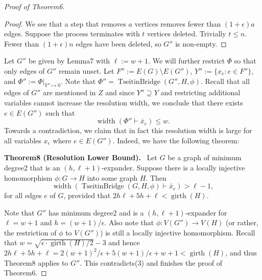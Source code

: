 \documentclass[10pt,a4paper]{article}
\newenvironment{authorclaim}[1]{\par\medskip\noindent\textbf{#1.}\ \ignorespaces}{\par\medskip}
\begin{document}
\begin{proof}[Proof of Theorem6]
\begin{proof}
We see that a step that removes $a$ vertices removes fewer than $(1+\epsilon)a$ edges. Suppose the process terminates with $t$ vertices deleted. Trivially $t\le n$. Fewer than $(1+\epsilon)n$ edges have been deleted, so $G''$ is non-empty.
\end{proof}
Let $G''$ be given by Lemma7 with $\ell:=w+1$. We will further restrict $\Phi$ so that only edges of $G''$ remain unset. Let $F'':=E(G)\setminus E(G'')$, $Y'':=\{x_e:e\in F''\}$, and $\Phi'':=\Phi|_{Y''\mapsto0}$. Note that $\Phi''=\operatorname{TseitinBridge}(G'',H,\phi)$. Recall that all edges of $G''$ are mentioned in $Z$ and since $Y''\supseteq Y$ and restricting additional variables cannot increase the resolution width, we conclude that there exists $e\in E(G'')$ such that
\begin{equation}
\operatorname{width}(\Phi''\vdash\bar x_e)\le w.\tag{3}
\end{equation}
Towards a contradiction, we claim that in fact this resolution width is large for all variables $x_e$ where $e\in E(G'')$. Indeed, we have the following theorem:
\begin{authorclaim}{Theorem8 (Resolution Lower Bound)}
Let $G$ be a graph of minimum degree2 that is an $(h,\ell+1)$-expander. Suppose there is a locally injective homomorphism $\phi:G\to H$ into some graph $H$. Then
\begin{equation}
\operatorname{width}(\operatorname{TseitinBridge}(G,H,\phi)\vdash\bar x_e)>\ell-1,\tag{4}
\end{equation}
for all edges $e$ of $G$, provided that $2h\ell+5h+\ell<\operatorname{girth}(H)$.
\end{authorclaim}
Note that $G''$ has minimum degree2 and is a $(h,\ell+1)$-expander for $\ell=w+1$ and $h=(w+1)/\epsilon$. Also note that $\phi:V(G'')\to V(H)$ (or rather, the restriction of $\phi$ to $V(G'')$) is still a locally injective homomorphism. Recall that $w=\sqrt{\epsilon\cdot\operatorname{girth}(H)/2}-3$ and hence $2h\ell+5h+\ell=2(w+1)^2/\epsilon+5(w+1)/\epsilon+w+1<\operatorname{girth}(H)$, and thus Theorem8 applies to $G''$. This contradicts(3) and finishes the proof of Theorem6.
\end{proof}
\end{document}
